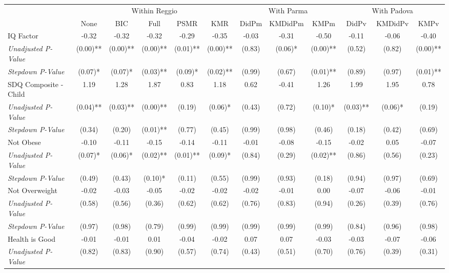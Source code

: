 \begin{tabular}{l c c c c c c c c c c c}
\toprule
& \multicolumn{5}{c}{Within Reggio} & \multicolumn{3}{c}{With Parma} & \multicolumn{3}{c}{With Padova} \\\cmidrule(lr){2-6} \cmidrule(lr){7-9} \cmidrule(lr){10-12}
 & None & BIC & Full & PSMR & KMR & DidPm & KMDidPm & KMPm & DidPv & KMDidPv & KMPv \\
\midrule
IQ Factor & -0.32 & -0.32 & -0.32 & -0.29 & -0.35 & -0.03 & -0.31 & -0.50 & -0.11 & -0.06 & -0.40 \\
\quad \textit{Unadjusted P-Value} & (0.00)** & (0.00)** & (0.00)** & (0.01)** & (0.00)** & (0.83) & (0.06)* & (0.00)** & (0.52) & (0.82) & (0.00)** \\
\quad \textit{Stepdown P-Value} & (0.07)* & (0.07)* & (0.03)** & (0.09)* & (0.02)** & (0.99) & (0.67) & (0.01)** & (0.89) & (0.97) & (0.01)** \\
SDQ Composite - Child & 1.19 & 1.28 & 1.87 & 0.83 & 1.18 & 0.62 & -0.41 & 1.26 & 1.99 & 1.95 & 0.78 \\
\quad \textit{Unadjusted P-Value} & (0.04)** & (0.03)** & (0.00)** & (0.19) & (0.06)* & (0.43) & (0.72) & (0.10)* & (0.03)** & (0.06)* & (0.19) \\
\quad \textit{Stepdown P-Value} & (0.34) & (0.20) & (0.01)** & (0.77) & (0.45) & (0.99) & (0.98) & (0.46) & (0.18) & (0.42) & (0.69) \\
Not Obese & -0.10 & -0.11 & -0.15 & -0.14 & -0.11 & -0.01 & -0.08 & -0.15 & -0.02 & 0.05 & -0.07 \\
\quad \textit{Unadjusted P-Value} & (0.07)* & (0.06)* & (0.02)** & (0.01)** & (0.09)* & (0.84) & (0.29) & (0.02)** & (0.86) & (0.56) & (0.23) \\
\quad \textit{Stepdown P-Value} & (0.49) & (0.43) & (0.10)* & (0.11) & (0.55) & (0.99) & (0.93) & (0.18) & (0.94) & (0.97) & (0.69) \\
Not Overweight & -0.02 & -0.03 & -0.05 & -0.02 & -0.02 & -0.02 & -0.01 & 0.00 & -0.07 & -0.06 & -0.01 \\
\quad \textit{Unadjusted P-Value} & (0.58) & (0.56) & (0.36) & (0.62) & (0.62) & (0.76) & (0.83) & (0.94) & (0.26) & (0.39) & (0.76) \\
\quad \textit{Stepdown P-Value} & (0.97) & (0.98) & (0.79) & (0.99) & (0.99) & (0.99) & (0.99) & (0.99) & (0.84) & (0.96) & (0.98) \\
Health is Good & -0.01 & -0.01 & 0.01 & -0.04 & -0.02 & 0.07 & 0.07 & -0.03 & -0.03 & -0.07 & -0.06 \\
\quad \textit{Unadjusted P-Value} & (0.82) & (0.83) & (0.90) & (0.57) & (0.74) & (0.43) & (0.51) & (0.70) & (0.76) & (0.39) & (0.31) \\

\end{tabular}
